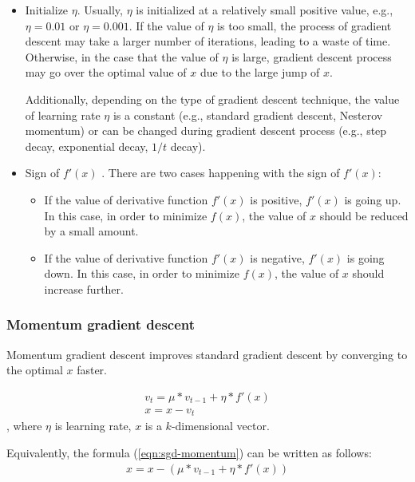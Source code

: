 \documentclass[12pt]{article}
\begin{document}
\begin{itemize}
	\item Initialize $\eta$.  Usually, $\eta$ is initialized at a relatively small positive value, e.g., $\eta = 0.01$ or $\eta = 0.001$. If the value of $\eta$ is too small, the process of gradient descent may take a larger number of iterations, leading to a waste of time. Otherwise, in the case that the value of $\eta$ is large, gradient descent process may go over the optimal value of $x$ due to the large jump of $x$.
	
	Additionally, depending on the type of gradient descent technique, the value of learning rate $\eta$ is a constant (e.g., standard gradient descent, Nesterov momentum) or can be changed during gradient descent process (e.g., step decay, exponential decay, $1/t$ decay).
	\item Sign of $f'(x)$ . There are two cases happening with the sign of $f'(x)$:
	
	\begin{itemize}
		\item If the value of derivative function $f'(x)$ is positive, $f'(x)$ is going up. In this case, in order to minimize $f(x)$, the value of $x$ should be reduced by a small amount.
		
		\item If the value of derivative function $f'(x)$ is negative, $f'(x)$ is going down. In this case, in order to minimize $f(x)$, the value of $x$ should increase further.
	\end{itemize}
\end{itemize}

\subsubsection{Momentum gradient descent}

Momentum gradient descent improves standard gradient descent by converging to the optimal $x$ faster. 

\begin{equation}
\begin{split}
\label{eqn:sgd-momentum}
v_{t} = \mu * v_{t-1} + \eta * f'(x)
\\
x = x - v_t
\end{split}
\end{equation}
, where $\eta$ is learning rate, $x$ is a $k$-dimensional vector.

Equivalently, the formula (\ref{eqn:sgd-momentum}) can be written as follows:
\begin{equation}
\begin{split}
\label{eqn:sgd-momentum-v2}
x = x - (\mu * v_{t-1} + \eta * f'(x))
\end{split}
\end{equation}
\end{document}

